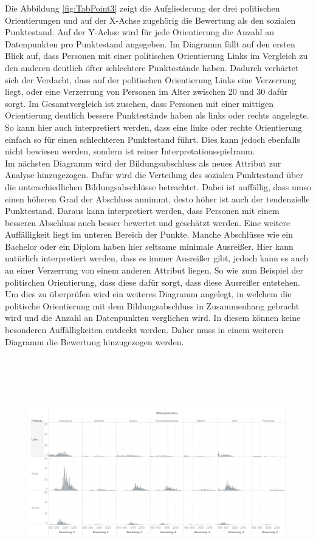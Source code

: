 \begin{onehalfspace}
Die Abbildung \ref{fig:TabPoint3} zeigt die Aufgliederung der drei politischen Orientierungen und auf der X-Achse zugehörig die Bewertung als den sozialen Punktestand. Auf der Y-Achse wird für jede Orientierung die Anzahl an Datenpunkten pro Punktestand angegeben. Im Diagramm fällt auf den ersten Blick auf, dass Personen mit einer politischen Orientierung Links im Vergleich zu den anderen deutlich öfter schlechtere Punktestände haben. Dadurch verhärtet sich der Verdacht, dass auf der politischen Orientierung Links eine Verzerrung liegt, oder eine Verzerrung von Personen im Alter zwischen 20 und 30 dafür sorgt. Im Gesamtvergleich ist zusehen, dass Personen mit einer mittigen Orientierung deutlich bessere Punktestände haben als links oder rechts angelegte. So kann hier auch interpretiert werden, dass eine linke oder rechte Orientierung einfach so für einen schlechteren Punktestand führt. Dies kann jedoch ebenfalls nicht bewiesen werden, sondern ist reiner Interpretationsspielraum. \\
Im nächsten Diagramm wird der Bildungsabschluss als neues Attribut zur Analyse hinzugezogen. Dafür wird die Verteilung des sozialen Punktestand über die unterschiedlichen Bildungsabschlüsse betrachtet. Dabei ist auffällig, dass umso einen höheren Grad der Abschluss annimmt, desto höher ist auch der tendenzielle Punktestand. Daraus kann interpretiert werden, dass Personen mit einem besseren Abschluss auch besser bewertet und geschätzt werden. Eine weitere Auffälligkeit liegt im unteren Bereich der Punkte. Manche Abschlüsse wie ein Bachelor oder ein Diplom haben hier seltsame minimale Ausreißer. Hier kann natürlich interpretiert werden, dass es immer Ausreißer gibt, jedoch kann es auch an einer Verzerrung von einem anderen Attribut liegen. So wie zum Beispiel der politischen Orientierung, dass diese dafür sorgt, dass diese Ausreißer entstehen. Um dies zu überprüfen wird ein weiteres Diagramm angelegt, in welchem die politische Orientierung mit dem Bildungsabschluss in Zusammenhang gebracht wird und die Anzahl an Datenpunkten verglichen wird. In diesem können keine besonderen Auffälligkeiten entdeckt werden. Daher muss in einem weiteren Diagramm die Bewertung hinzugezogen werden.
\begin{figure}[h]
    \centering
    \includegraphics[width=16cm,height=10cm]{Diagramme/Tab_Point4.PNG}

\end{figure}
\end{onehalfspace}
